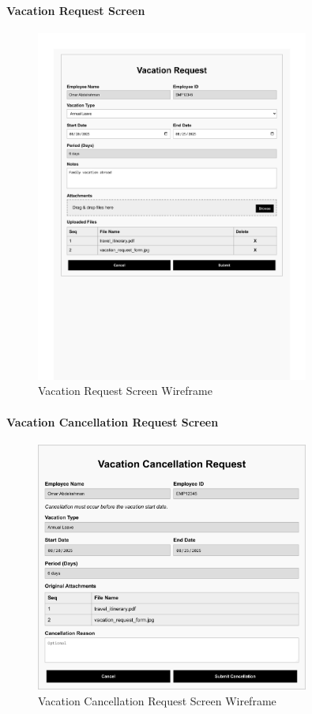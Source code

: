 \documentclass[12pt,a4paper]{article}
\begin{document}
\paragraph{Vacation Request Screen}
\begin{figure}[H]
\centering
\includegraphics[width=0.8\textwidth]{Wireframes/Vacation-Request/Vacation-Request-1.png}
\caption{Vacation Request Screen Wireframe}
\label{fig:wireframe-vacation-request}
\end{figure}

\paragraph{Vacation Cancellation Request Screen}
\begin{figure}[H]
\centering
\includegraphics[width=0.8\textwidth]{Wireframes/Vacation-Cancellation-Request/Vacation-Cancellation-Request-1.png}
\caption{Vacation Cancellation Request Screen Wireframe}
\label{fig:wireframe-vacation-cancellation}
\end{figure}
\end{document}
